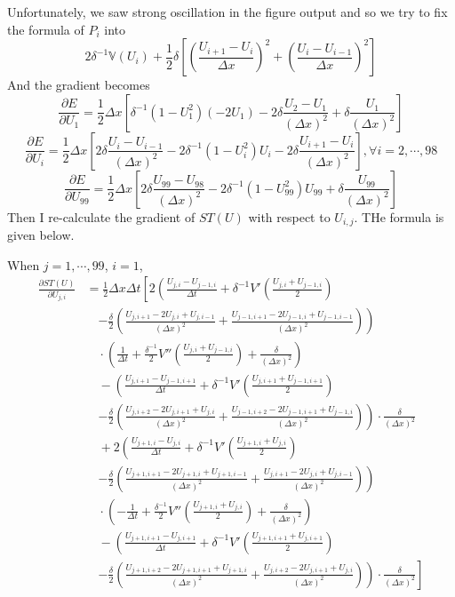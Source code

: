 \documentclass{article}
\begin{document}
\vspace{1em}
\noindent
Unfortunately, we saw strong oscillation in the figure output and so we try to fix the formula of $P_i$ into
\[
2\delta^{-1}\mathbb{V}(U_i)+\frac{1}{2}\delta\left[\left(\frac{U_{i+1} - U_i}{\Delta x}\right)^2 + \left(\frac{U_i - U_{i-1}}{\Delta x}\right)^2\right]
\]
And the gradient becomes
\[
\frac{\partial E}{\partial U_1} = \frac{1}{2}\Delta x \left[\delta^{-1}(1 - U_1^2)(-2U_1) - 2\delta \frac{U_2 - U_1}{(\Delta x)^2} +\delta \frac{U_1}{(\Delta x)^2}\right]
\]
\[
  \frac{\partial E}{\partial U_i} = \frac{1}{2}\Delta x\left[2\delta\frac{U_i - U_{i-1}}{(\Delta x)^2} - 2\delta^{-1}(1 - U_i^2)U_i - 2\delta\frac{U_{i+1} - U_i}{(\Delta x)^2}\right], \forall i = 2,\cdots, 98
\]
\[
  \frac{\partial E}{\partial U_{99}} = \frac{1}{2}\Delta x\left[2\delta\frac{U_{99} - U_{98}}{(\Delta x)^2} - 2\delta^{-1}(1 - U_{99}^2)U_{99} + \delta\frac{U_{99}}{(\Delta x)^2}\right]
\]
Then I re-calculate the gradient of $ST(U)$ with respect to $U_{i,j}$. THe formula is given below.

When $j = 1,\cdots,99$, $i  =  1$,
\begin{align*}
  \frac{\partial ST(U)}{\partial U_{j,i}} &= \frac{1}{2}\Delta x \Delta t \left[ 2 \left( \frac{U_{j,i} - U_{j-1,i}}{\Delta t} 
  + \delta^{-1} V'\left( \frac{U_{j,i} + U_{j-1,i}}{2} \right) \right. \right. \\
  &\quad \left. - \frac{\delta}{2} \left( \frac{U_{j,i+1} - 2U_{j,i} + U_{j,i-1}}{(\Delta x)^2} 
  + \frac{U_{j-1,i+1} - 2U_{j-1,i} + U_{j-1,i-1}}{(\Delta x)^2} \right) \right) \\
  &\quad \cdot \left( \frac{1}{\Delta t} + \frac{\delta^{-1}}{2} V''\left( \frac{U_{j,i} + U_{j-1,i}}{2} \right) 
  + \frac{\delta}{(\Delta x)^2} \right) \\
  &\quad - \left( \frac{U_{j,i+1} - U_{j-1,i+1}}{\Delta t} 
  + \delta^{-1} V'\left( \frac{U_{j,i+1} + U_{j-1,i+1}}{2} \right) \right. \\
  &\quad \left. - \frac{\delta}{2} \left( \frac{U_{j,i+2} - 2U_{j,i+1} + U_{j,i}}{(\Delta x)^2} 
  + \frac{U_{j-1,i+2} - 2U_{j-1,i+1} + U_{j-1,i}}{(\Delta x)^2} \right) \right) \cdot \frac{\delta}{(\Delta x)^2} \\
  &\quad + 2 \left( \frac{U_{j+1,i} - U_{j,i}}{\Delta t} 
  + \delta^{-1} V'\left( \frac{U_{j+1,i} + U_{j,i}}{2} \right) \right. \\
  &\quad \left. - \frac{\delta}{2} \left( \frac{U_{j+1,i+1} - 2U_{j+1,i} + U_{j+1,i-1}}{(\Delta x)^2} 
  + \frac{U_{j,i+1} - 2U_{j,i} + U_{j,i-1}}{(\Delta x)^2} \right) \right) \\
  &\quad \cdot \left( -\frac{1}{\Delta t} + \frac{\delta^{-1}}{2} V''\left( \frac{U_{j+1,i} + U_{j,i}}{2} \right) 
  + \frac{\delta}{(\Delta x)^2} \right) \\
  &\quad - \left( \frac{U_{j+1,i+1} - U_{j,i+1}}{\Delta t} 
  + \delta^{-1} V'\left( \frac{U_{j+1,i+1} + U_{j,i+1}}{2} \right) \right. \\
  &\quad \left. \left. - \frac{\delta}{2} \left( \frac{U_{j+1,i+2} - 2U_{j+1,i+1} + U_{j+1,i}}{(\Delta x)^2} 
  + \frac{U_{j,i+2} - 2U_{j,i+1} + U_{j,i}}{(\Delta x)^2} \right) \right) \cdot \frac{\delta}{(\Delta x)^2} \right]
\end{align*}
\end{document}
